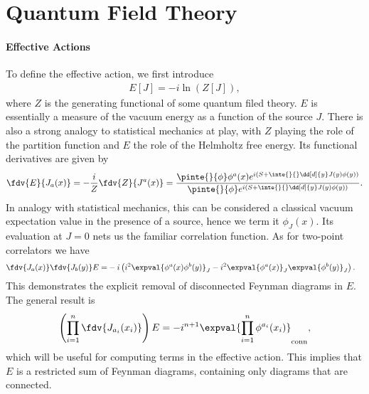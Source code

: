 \section{Quantum Field Theory}

\paragraph{Effective Actions}
To define the effective action, we first introduce
\begin{align*}
	E[J] = -i\ln(Z[J]),
\end{align*}
where $Z$ is the generating functional of some quantum filed theory. $E$ is essentially a measure of the vacuum energy as a function of the source $J$. There is also a strong analogy to statistical mechanics at play, with $Z$ playing the role of the partition function and $E$ the role of the Helmholtz free energy. Its functional derivatives are given by
\begin{align*}
	\fdv{E}{J_{a}(x)} = -\frac{i}{Z}\fdv{Z}{J^{a}(x)} = \frac{\pinte{}{\phi}\phi^{a}(x)e^{i\left(S + \inte{}{}\dd[d]{y}J(y)\phi(y)\right)}}{\pinte{}{\phi}e^{i\left(S + \inte{}{}\dd[d]{y}J(y)\phi(y)\right)}}.
\end{align*}
In analogy with statistical mechanics, this can be considered a classical vacuum expectation value in the presence of a source, hence we term it $\phi_{J}(x)$. Its evaluation at $J = 0$ nets us the familiar correlation function. As for two-point correlators we have
\begin{align*}
	\fdv{J_{a}(x)}\fdv{J_{b}(y)}E =& -i\left(i^{2}\expval{\phi^{a}(x)\phi^{b}(y)}_{J} - i^{2}\expval{\phi^{a}(x)}_{J}\expval{\phi^{b}(y)}_{J}\right).
\end{align*}
This demonstrates the explicit removal of disconnected Feynman diagrams in $E$. The general result is
\begin{align*}
	\left(\prod\limits_{i = 1}^{n}\fdv{J_{a_{i}}(x_{i})}\right)E = -i^{n + 1}\expval{\prod\limits_{i = 1}^{n}\phi^{a_{i}}(x_{i})}_{\text{conn}},
\end{align*}
which will be useful for computing terms in the effective action. This implies that $E$ is a restricted sum of Feynman diagrams, containing only diagrams that are connected.

